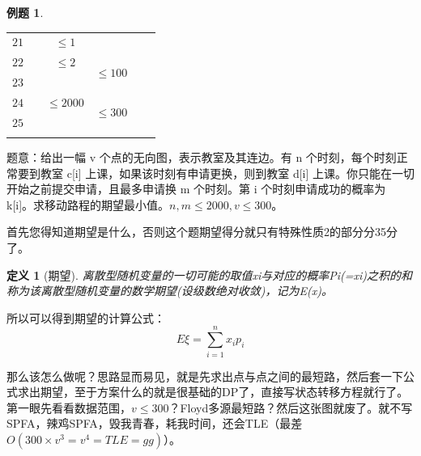 \documentclass{article}
\newtheorem{example}{例题}[subsection]
\newtheorem{definition}{定义}[subsection]
\theoremstyle{nonumberplain}
\begin{document}
\begin{example}
\begin{center}
\begin{tabular}{c|c|c|c|c|c}
				\cline{1-1}\cline{3-3}
				$21$   &                              & $\leq 1$                     &                             &                          &                          \\
				\cline{1-1}\cline{3-4}
				$22$   &                              & $\leq 2$                     & \multirow{2}{*}{$\leq 100$} &                                                     \\
				\cline{1-1}\cline{3-3}
				$23$   &                              & \multirow{3}{*}{$\leq 2000$} &                             &                          &                          \\
				\cline{1-1}\cline{4-4}
				$24$   &                              &                              & \multirow{2}{*}{$\leq 300$} &                                                     \\
				\cline{1-1}
				$25$   &                              &                              &                             &                                                     \\
				\Xhline{1.2pt}
			\end{tabular}
		\end{center}
	\end{example}

	题意：给出一幅 v 个点的无向图，表示教室及其连边。有 n 个时刻，每个时刻正常要到教室 c[i] 上课，如果该时刻有申请更换，则到教室 d[i] 上课。你只能在一切开始之前提交申请，且最多申请换 m 个时刻。第 i 个时刻申请成功的概率为 k[i]。求移动路程的期望最小值。$n,m\leq 2000, v\leq 300$。

	首先您得知道期望是什么，否则这个题期望得分就只有特殊性质2的部分分35分了。

	\begin{definition}[期望]离散型随机变量的一切可能的取值xi与对应的概率Pi(=xi)之积的和称为该离散型随机变量的数学期望(设级数绝对收敛)，记为E(x)。
	\end{definition}

	所以可以得到期望的计算公式：
	\begin{equation*}E\xi=\sum_{i=1}^n x_i p_i\end{equation*}

	那么该怎么做呢？思路显而易见，就是先求出点与点之间的最短路，然后套一下公式求出期望，至于方案什么的就是很基础的DP了，直接写状态转移方程就行了。第一眼先看看数据范围，$v\leq 300$？Floyd多源最短路？然后这张图就废了。就不写SPFA，辣鸡SPFA，毁我青春，耗我时间，还会TLE（最差$O(300\times v^3 = v^4=TLE=gg)$）。
\end{document}
